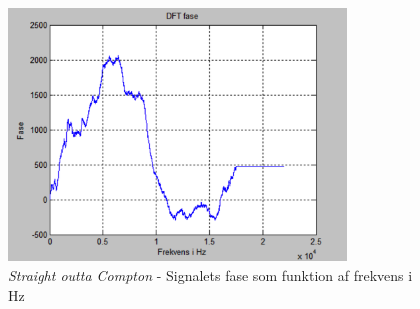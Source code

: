 \begin{figure}[H]
	\centering
	\includegraphics[width=0.8\textwidth]{Figurer/Snip20151001_19}
	\caption{\textit{Straight outta Compton} - Signalets fase som funktion af frekvens i Hz}
\end{figure} 













